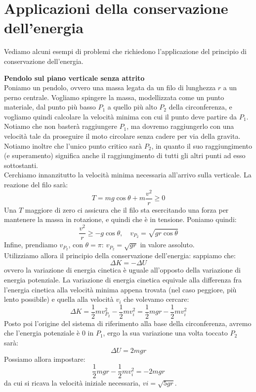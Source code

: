 \documentclass[a4paper,12pt]{article}
\begin{document}
\section{Applicazioni della conservazione dell'energia}
Vediamo alcuni esempi di problemi che richiedono l'applicazione del principio di conservazione dell'energia.
\par\smallskip
\textbf{Pendolo sul piano verticale senza attrito} \\
Poniamo un pendolo, ovvero una massa legata da un filo di lunghezza $r$ a un perno centrale. Vogliamo spingere
la massa, modellizzata come un punto materiale, dal punto più basso $P_1$ a quello più alto $P_2$ della circonferenza, e vogliamo
quindi calcolare la velocità minima con cui il punto deve partire da $P_1$. Notiamo che non basterà raggiungere
$P_1$, ma dovremo raggiungerlo con una velocità tale da proseguire il moto circolare senza cadere per via della gravita.
Notiamo inoltre che l'unico punto critico sarà $P_2$, in quanto il suo raggiungimento (e superamento) significa anche il
raggiungimento di tutti gli altri punti ad esso sottostanti. \\
Cerchiamo innanzitutto la velocità minima necessaria all'arrivo sulla verticale. La reazione del filo sarà:
$$ T = mg\cos{\theta} + m\frac{v^2}{r} \geq 0 $$
Una $T$ maggiore di zero ci assicura che il filo sta esercitando una forza per mantenere la massa in rotazione, e quindi
che è in tensione. Poniamo quindi:
$$ \frac{v^2}{r} \geq -g\cos{\theta}, \quad v_{P_2} = \sqrt{gr\cos{\theta}}$$
Infine, prendiamo $v_{P_2}$, con $\theta = \pi$: $v_{P_2} = \sqrt{gr}$ in valore assoluto. \\
Utilizziamo allora il principio della conservazione dell'energia: sappiamo che:
$$ \Delta K = -\Delta U $$
ovvero la variazione di energia cinetica è uguale all'opposto della variazione di energia potenziale. 
La variazione di energia cinetica equivale alla differenza fra l'energia cinetica alla velocità minima appena trovata (nel caso peggiore, più lento
possibile) e quella alla velocità $v_i$ che volevamo cercare:
$$ \Delta K = \frac{1}{2}mv_{P_2}^2 - \frac{1}{2}mv_i^2 = \frac{1}{2}mgr - \frac{1}{2}mv_i^2$$
Posto poi l'origine del sistema di riferimento alla base della circonferenza, avremo che l'energia potenziale è 0 in $P_1$,
ergo la sua variazione una volta toccato $P_2$ sarà:
$$ \Delta U = 2mgr$$
Possiamo allora impostare:
$$ \frac{1}{2}mgr - \frac{1}{2}mv_i^2 = -2mgr $$
da cui si ricava la velocità iniziale necessaria, $vi = \sqrt{5gr}$.
\par\smallskip
\end{document}
